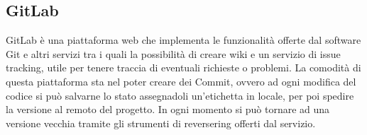 \subsection{GitLab}
GitLab \`e una piattaforma web che implementa le funzionalit\`a offerte dal software Git e altri
servizi tra i quali la possibilit\`a di creare wiki e un servizio di issue tracking, utile per tenere traccia
di eventuali richieste o problemi.
La comodità di questa piattaforma sta nel poter creare dei Commit, ovvero ad ogni modifica del codice si può
salvarne lo stato assegnadoli un'etichetta in locale, per poi spedire la versione al remoto del progetto.
In ogni momento si può tornare ad una versione vecchia tramite gli strumenti di reversering offerti dal servizio.
